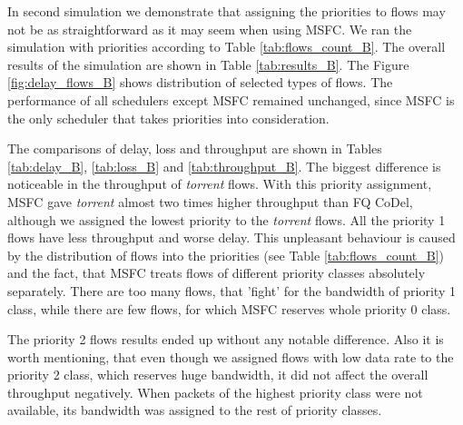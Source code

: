 

In second simulation we demonstrate that assigning the priorities to flows may not be as straightforward as it may seem when using MSFC. We ran the simulation with priorities according to Table \ref{tab:flows_count_B}. The overall results of the simulation are shown in Table \ref{tab:results_B}. The Figure \ref{fig:delay_flows_B} shows distribution of selected types of flows. The performance of all schedulers except MSFC remained unchanged, since MSFC is the only scheduler that takes priorities into consideration.

The comparisons of delay, loss and throughput are shown in Tables \ref{tab:delay_B}, \ref{tab:loss_B} and \ref{tab:throughput_B}. The biggest difference is noticeable in the throughput of \emph{torrent} flows. With this priority assignment, MSFC gave \emph{torrent} almost two times higher throughput than FQ CoDel, although we assigned the lowest priority to the \emph{torrent} flows. All the priority 1 flows have less throughput and worse delay. This unpleasant behaviour is caused by the distribution of flows into the priorities (see Table \ref{tab:flows_count_B}) and the fact, that MSFC treats flows of different priority classes absolutely separately. There are too many flows, that 'fight' for the bandwidth of priority 1 class, while there are few flows, for which MSFC reserves whole priority 0 class.

The priority 2 flows results ended up without any notable difference. Also it is worth mentioning, that even though we assigned flows with low data rate to the priority 2 class, which reserves huge bandwidth, it did not affect the overall throughput negatively. When packets of the highest priority class were not available, its bandwidth was assigned to the rest of priority classes.





